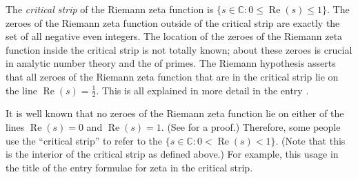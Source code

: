 \documentclass[12pt]{article}
\begin{document}
The {\em critical strip} of the Riemann zeta function is $\{ s \in \mathbb{C}: 0 \le \operatorname{Re}(s) \le 1 \}$.  The zeroes of the Riemann zeta function outside of the critical strip are exactly the set of all negative even integers.  The location of the zeroes of the Riemann zeta function inside the critical strip is not totally known;  about these zeroes is crucial in analytic number theory and the  of primes.  The Riemann hypothesis asserts that all zeroes of the Riemann zeta function that are in the critical strip lie on the line $\operatorname{Re}(s)=\frac{1}{2}$.  This is all explained in more detail in the entry .

It is well known that no zeroes of the Riemann zeta function lie on either of the lines $\operatorname{Re}(s)=0$ and $\operatorname{Re}(s)=1$.  (See  for a proof.)  Therefore, some people use the  ``critical strip'' to refer to the  $\{ s \in \mathbb{C}: 0<\operatorname{Re}(s)<1 \}$.  (Note that this is the interior of the critical strip as defined above.)  For example, this usage  in the title of the entry formulae for zeta in the critical strip.
\end{document}
